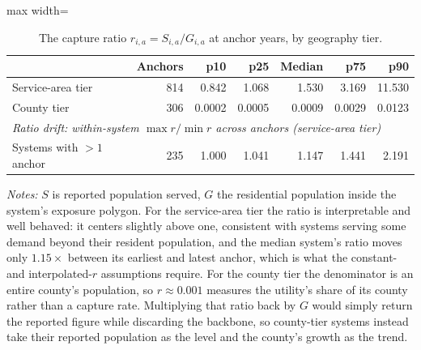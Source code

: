 \begin{table}[ht]
\centering
\caption{The capture ratio $r_{i,a}=S_{i,a}/G_{i,a}$ at anchor years, by geography tier.}
\label{tab:backcast_ratio}
\begin{adjustbox}{max width=\textwidth}
\begin{tabular}{lrrrrrr}
\toprule
& Anchors & p10 & p25 & Median & p75 & p90 \\
\midrule
Service-area tier & 814 & 0.842 & 1.068 & 1.530 & 3.169 & 11.530 \\
County tier & 306 & 0.0002 & 0.0005 & 0.0009 & 0.0029 & 0.0123 \\
\midrule
\multicolumn{7}{l}{\textit{Ratio drift: within-system $\max r / \min r$ across anchors (service-area tier)}} \\
Systems with $>1$ anchor & 235 & 1.000 & 1.041 & 1.147 & 1.441 & 2.191 \\
\bottomrule
\end{tabular}
\end{adjustbox}
\begin{minipage}{\textwidth}\footnotesize\raggedright
\vspace{0.5em}
\textit{Notes:} $S$ is reported population served, $G$ the residential population inside the system's exposure polygon. For the service-area tier the ratio is interpretable and well behaved: it centers slightly above one, consistent with systems serving some demand beyond their resident population, and the median system's ratio moves only $1.15\times$ between its earliest and latest anchor, which is what the constant- and interpolated-$r$ assumptions require. For the county tier the denominator is an entire county's population, so $r\approx 0.001$ measures the utility's share of its county rather than a capture rate. Multiplying that ratio back by $G$ would simply return the reported figure while discarding the backbone, so county-tier systems instead take their reported population as the level and the county's growth as the trend.
\end{minipage}
\end{table}
